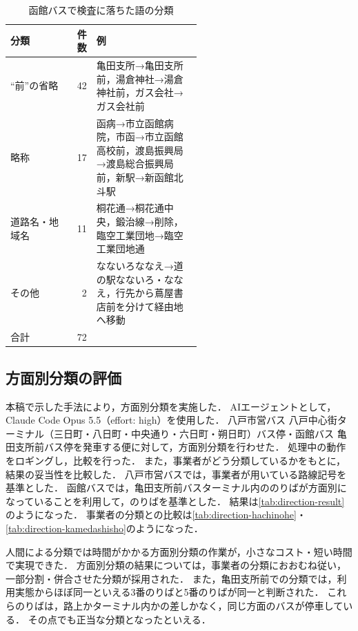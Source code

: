 \begin{table}[tb]
    \centering
    \caption{函館バスで検査に落ちた語の分類}
    \label{tab:headsign-error-goryokaku}
    \scriptsize
    \begin{tabular}{lrp{0.55\linewidth}}
        \toprule
        分類 & 件数 & 例 \\
        \midrule
        ``前''の省略 & 42 & 亀田支所→亀田支所前，湯倉神社→湯倉神社前，ガス会社→ガス会社前 \\
        略称 & 17 & 函病→市立函館病院，市函→市立函館高校前，渡島振興局→渡島総合振興局前，新駅→新函館北斗駅 \\
        道路名・地域名 & 11 & 桐花通→桐花通中央，鍛治線→削除，臨空工業団地→臨空工業団地通 \\
        その他 & 2 & なないろななえ→道の駅なないろ・ななえ，行先から蔦屋書店前を分けて経由地へ移動 \\
        \midrule
        合計 & 72 & \\
        \bottomrule
    \end{tabular}
\end{table}

\subsection{方面別分類の評価}

本稿で示した手法により，方面別分類を実施した．
AIエージェントとして，Claude Code Opus 5.5（effort: high）を使用した．
八戸市営バス 八戸中心街ターミナル（三日町・八日町・中央通り・六日町・朔日町）バス停・函館バス 亀田支所前バス停を発車する便に対して，方面別分類を行わせた．
処理中の動作をロギングし，比較を行った．
また，事業者がどう分類しているかをもとに，結果の妥当性を比較した．
八戸市営バスでは，事業者が用いている路線記号を基準とした．
函館バスでは，亀田支所前バスターミナル内ののりばが方面別になっていることを利用して，のりばを基準とした．
結果は\cref{tab:direction-result}のようになった．
事業者の分類との比較は\cref{tab:direction-hachinohe}・\cref{tab:direction-kamedashisho}のようになった．

人間による分類では時間がかかる方面別分類の作業が，小さなコスト・短い時間で実現できた．
方面別分類の結果については，事業者の分類におおむね従い，一部分割・併合させた分類が採用された．
また，亀田支所前での分類では，利用実態からほぼ同一といえる3番のりばと5番のりばが同一と判断された．
これらのりばは，路上かターミナル内かの差しかなく，同じ方面のバスが停車している．
その点でも正当な分類となったといえる．


